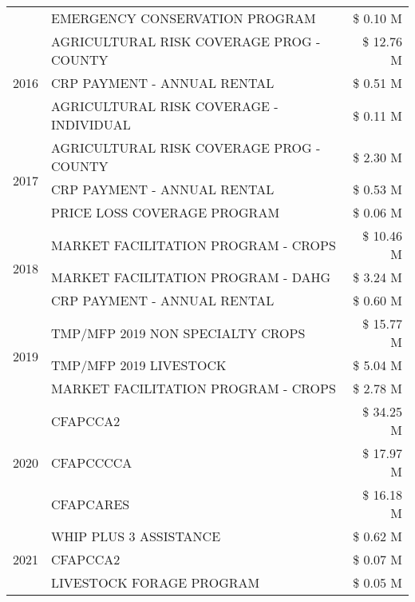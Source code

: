 \begin{tabular}{llr}
 & EMERGENCY CONSERVATION PROGRAM & \$ 0.10 M \\
\cline{1-3}
\multirow[t]{3}{*}{2016} & AGRICULTURAL RISK COVERAGE PROG - COUNTY & \$ 12.76 M \\
 & CRP PAYMENT - ANNUAL RENTAL & \$ 0.51 M \\
 & AGRICULTURAL RISK COVERAGE - INDIVIDUAL & \$ 0.11 M \\
\cline{1-3}
\multirow[t]{3}{*}{2017} & AGRICULTURAL RISK COVERAGE PROG - COUNTY & \$ 2.30 M \\
 & CRP PAYMENT - ANNUAL RENTAL & \$ 0.53 M \\
 & PRICE LOSS COVERAGE PROGRAM & \$ 0.06 M \\
\cline{1-3}
\multirow[t]{3}{*}{2018} & MARKET FACILITATION PROGRAM - CROPS & \$ 10.46 M \\
 & MARKET FACILITATION PROGRAM - DAHG & \$ 3.24 M \\
 & CRP PAYMENT - ANNUAL RENTAL & \$ 0.60 M \\
\cline{1-3}
\multirow[t]{3}{*}{2019} & TMP/MFP 2019 NON SPECIALTY CROPS & \$ 15.77 M \\
 & TMP/MFP 2019 LIVESTOCK & \$ 5.04 M \\
 & MARKET FACILITATION PROGRAM - CROPS & \$ 2.78 M \\
\cline{1-3}
\multirow[t]{3}{*}{2020} & CFAPCCA2 & \$ 34.25 M \\
 & CFAPCCCCA & \$ 17.97 M \\
 & CFAPCARES & \$ 16.18 M \\
\cline{1-3}
\multirow[t]{3}{*}{2021} & WHIP PLUS 3 ASSISTANCE & \$ 0.62 M \\
 & CFAPCCA2 & \$ 0.07 M \\
 & LIVESTOCK FORAGE PROGRAM & \$ 0.05 M \\
\cline{1-3}
\bottomrule
\end{tabular}
